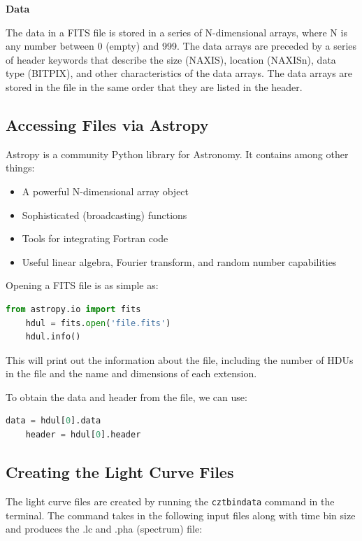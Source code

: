 \documentclass[11pt]{book} %
\begin{document}
\noindent\textbf{Data}

The data in a FITS file is stored in a series of N-dimensional arrays, where N is any number between 0 (empty) and 999. The data arrays are preceded by a series of header keywords that describe the size (NAXIS), location (NAXISn), data type (BITPIX), and other characteristics of the data arrays. The data arrays are stored in the file in the same order that they are listed in the header.

\subsection{Accessing Files via Astropy}

Astropy is a community Python library for Astronomy. It contains among other things:

\begin{itemize}
    \item A powerful N-dimensional array object
    \item Sophisticated (broadcasting) functions
    \item Tools for integrating Fortran code
    \item Useful linear algebra, Fourier transform, and random number capabilities
\end{itemize}

Opening a FITS file is as simple as:

\begin{lstlisting}[language=Python]
    from astropy.io import fits
    hdul = fits.open('file.fits')
    hdul.info()
\end{lstlisting}

This will print out the information about the file, including the number of HDUs in the file and the name and dimensions of each extension.

To obtain the data and header from the file, we can use:

\begin{lstlisting}[language=Python]
    data = hdul[0].data
    header = hdul[0].header
\end{lstlisting}


\subsection{Creating the Light Curve Files}

The light curve files are created by running the \lstinline[language=bash]{cztbindata} command in the terminal. The command takes in the following input files along with time bin size and produces the .lc and .pha (spectrum) file:
\end{document}
